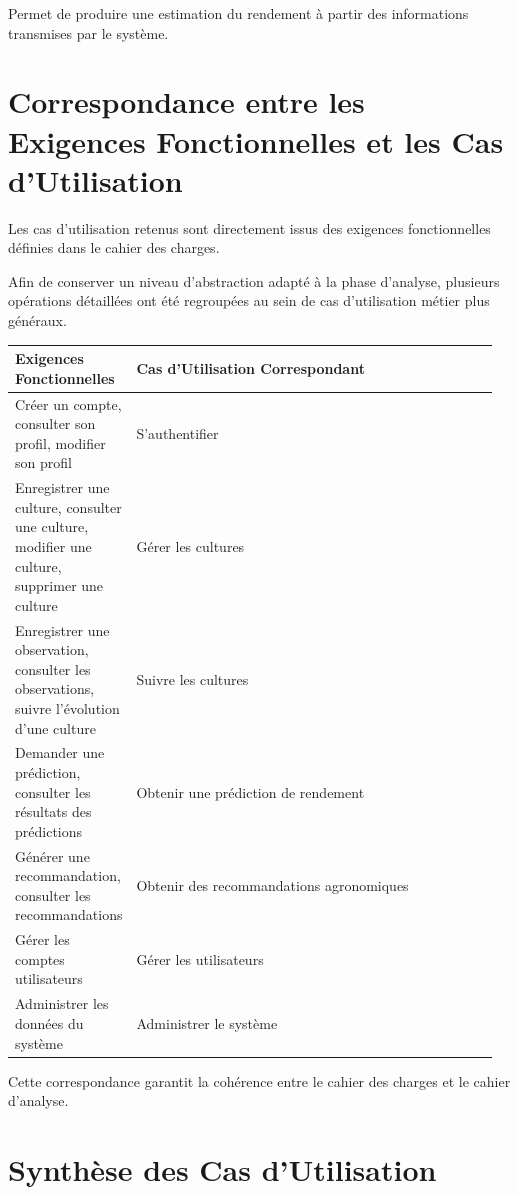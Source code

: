 Permet de produire une estimation du rendement à partir des informations
transmises par le système.

\hypertarget{correspondance-entre-les-exigences-fonctionnelles-et-les-cas-dutilisation}{%
\section{Correspondance entre les Exigences Fonctionnelles et les
Cas
d'Utilisation}\label{correspondance-entre-les-exigences-fonctionnelles-et-les-cas-dutilisation}}

Les cas d'utilisation retenus sont directement issus des exigences
fonctionnelles définies dans le cahier des charges.

Afin de conserver un niveau d'abstraction adapté à la phase d'analyse,
plusieurs opérations détaillées ont été regroupées au sein de cas
d'utilisation métier plus généraux.

\begin{longtable}{@{}p{0.18\linewidth}p{0.78\linewidth}@{}}
\toprule
\rowcolors{2}{gray!10}{white}
\textbf{Exigences Fonctionnelles} & \textbf{Cas d'Utilisation Correspondant} \\
\midrule
\endhead
Créer un compte, consulter son profil, modifier son profil &
S'authentifier \\
Enregistrer une culture, consulter une culture, modifier une culture,
supprimer une culture & Gérer les cultures \\
Enregistrer une observation, consulter les observations, suivre
l'évolution d'une culture & Suivre les cultures \\
Demander une prédiction, consulter les résultats des prédictions &
Obtenir une prédiction de rendement \\
Générer une recommandation, consulter les recommandations & Obtenir des
recommandations agronomiques \\
Gérer les comptes utilisateurs & Gérer les utilisateurs \\
Administrer les données du système & Administrer le système \\
\bottomrule
\end{longtable}

Cette correspondance garantit la cohérence entre le cahier des charges
et le cahier d'analyse.

\hypertarget{synthuxe8se-des-cas-dutilisation}{%
\section{Synthèse des Cas
d'Utilisation}\label{synthuxe8se-des-cas-dutilisation}}

